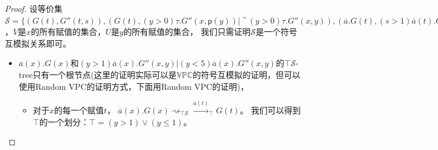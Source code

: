 \begin{proof}
   设等价集$\mathcal{S} = \{(G(t),G''(t,s)),(G(t),(y>0)\tau.G''(x,\mathsf{p}(y))|\urcorner (y>0)\tau.G''(x,y)),(\overline{a}.G(t),(s>1)\overline{a}(t).G''(t,s)|(s<5)\overline{a}(t).G''(t,s))\mid t\in V,s\in U\}$，$V$是$x$的所有赋值的集合，$U$是$y$的所有赋值的集合，
   我们只需证明$\mathcal{S}$是一个符号互模拟关系即可。
   \begin{itemize}
      \item {
         $\overline{a}(x).G(x)$和$(y>1)\overline{a}(x).G''(x,y)|(y<5)\overline{a}(x).G''(x,y)$的$\top\mathcal{S}$-tree只有一个根节点(这里的证明实际可以是$\mathbb{VPC}$的符号互模拟的证明，但可以使用Random VPC的证明方式，下面用Random VPC的证明)，
         \begin{itemize}
            \item {
               对于$x$的每一个赋值$t$，
               $\overline{a}(x).G(x)\rightsquigarrow_{\top\mathcal{S}}\stackrel{\overline{a}(t)}{\longrightarrow}_{\top}G(t)$。
               我们可以得到$\top$的一个划分：$\top=(y>1)\vee (y\leq 1)$。
      
}
\end{itemize}}
\end{itemize}
\end{proof}
